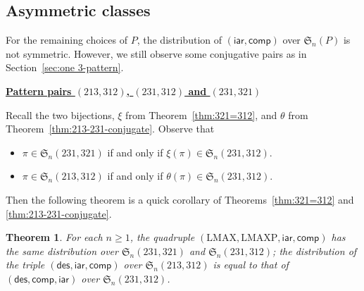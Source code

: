 \documentclass[12pt]{amsart}
\numberwithin{equation}{section}
\theoremstyle{plain}
\newtheorem{theorem}{Theorem}[section]
\theoremstyle{definition}
\def\des{\mathsf{des}}
\def\S{\mathfrak{S}}
\def\iar{\mathsf{iar}}
\def\comp{\mathsf{comp}}
\def\LMAX{\mathrm{LMAX}}
\def\LMAXP{\mathrm{LMAXP}}
\begin{document}
\subsection{Asymmetric classes}

For the remaining choices of $P$, the distribution of $(\iar,\comp)$ over $\S_n(P)$ is not symmetric. However, we still observe some conjugative pairs as in Section~\ref{sec:one 3-pattern}.

\medskip
\noindent \underline{\bf Pattern pairs $(213,312)$, $(231,312)$ and $(231,321)$}
\medskip

Recall the two bijections, $\xi$ from Theorem~\ref{thm:321=312}, and $\theta$ from Theorem~\ref{thm:213-231-conjugate}. Observe that
\begin{itemize}
	\item $\pi\in\S_n(231,321)$ if and only if $\xi(\pi)\in\S_n(231,312)$.
	\item $\pi\in\S_n(213,312)$ if and only if $\theta(\pi)\in\S_n(231,312)$.
\end{itemize}
Then the following theorem is a quick corollary of Theorems~\ref{thm:321=312} and \ref{thm:213-231-conjugate}.

\begin{theorem}\label{thm:triple-two-3}
For each $n\ge 1$, the quadruple $(\LMAX,\LMAXP,\iar,\comp)$ has the same distribution over $\S_n(231,321)$ and $\S_n(231,312)$; the distribution of the triple $(\des,\iar,\comp)$ over $\S_n(213,312)$ is equal to that of $(\des,\comp,\iar)$ over $\S_n(231,312)$.
\end{theorem}
\end{document}
